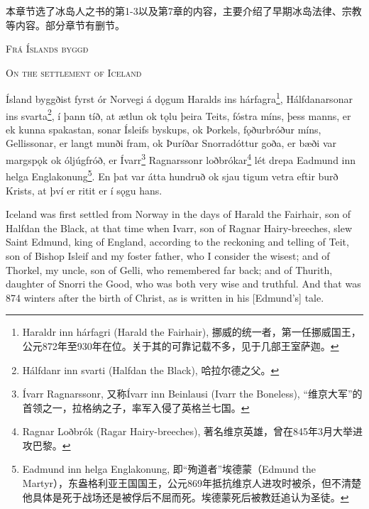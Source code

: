 本章节选了冰岛人之书的第1-3以及第7章的内容，主要介绍了早期冰岛法律、宗教等内容。部分章节有删节。
\begin{paracol}{2}
    \begin{center}
        \textsc{Frá Íslands byggð}
    \end{center}

    \switchcolumn

    \begin{center}
        \textsc{On the settlement of Iceland}
    \end{center}

    \switchcolumn*

    Ísland byggðist fyrst ór Norvegi á dǫgum Haralds ins hárfagra\footnote{Haraldr inn hárfagri (Harald the Fairhair), 挪威的统一者，第一任挪威国王，公元872年至930年在位。关于其的可靠记载不多，见于几部王室萨迦。}, Hálfdanarsonar ins svarta\footnote{Hálfdanr inn svarti (Halfdan the Black), 哈拉尔德之父。}, í þann tíð, at ætlun ok tǫlu þeira Teits, fóstra míns, þess manns, er ek kunna spakastan, sonar Ísleifs byskups, ok Þorkels, fǫðurbróður míns, Gellissonar, er langt munði fram, ok Þuríðar Snorradóttur goða, er bæði var margspǫk ok óljúgfróð, er Ívarr\footnote{Ívarr Ragnarssonr, 又称Ívarr inn Beinlausi (Ivarr the Boneless), “维京大军”的首领之一，拉格纳之子，率军入侵了英格兰七国。} Ragnarssonr loðbrókar\footnote{Ragnar Loðbrók (Ragar Hairy-breeches), 著名维京英雄，曾在845年3月大举进攻巴黎。} lét drepa Eadmund inn helga Englakonung\footnote{Eadmund inn helga Englakonung, 即“殉道者”埃德蒙（Edmund the Martyr），东盎格利亚王国国王，公元869年抵抗维京人进攻时被杀，但不清楚他具体是死于战场还是被俘后不屈而死。埃德蒙死后被教廷追认为圣徒。}. En þat var átta hundruð ok sjau tigum vetra eftir burð Krists, at því er ritit er í sǫgu hans.
    \switchcolumn

    Iceland was first settled from Norway in the days of Harald the Fairhair, son of Halfdan the Black, at that time when Ivarr, son of Ragnar Hairy-breeches, slew Saint Edmund, king of England, according to the reckoning and telling of Teit, son of Bishop Isleif and my foster father, who I consider the wisest; and of Thorkel, my uncle, son of Gelli, who remembered far back; and of Thurith, daughter of Snorri the Good, who was both very wise and truthful. And that was 874 winters after the birth of Christ, as is written in his [Edmund's] tale.
\end{paracol}

